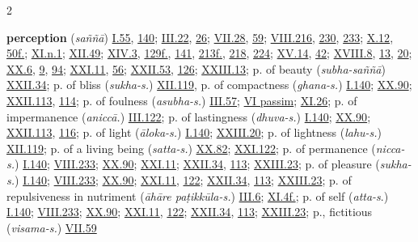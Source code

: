 \begin{multicols}{2}
\begin{vismHanging}
\par\textbf{perception} (\emph{saññā}) \hyperlink{I.55}{I.55}{}, \hyperlink{I.140}{140}{}; \hyperlink{III.22}{III.22}{}, \hyperlink{III.26}{26}{}; \hyperlink{VII.28}{VII.28}{}, \hyperlink{VII.59}{59}{}; \hyperlink{VIII.216}{VIII.216}{}, \hyperlink{VIII.230}{230}{}, \hyperlink{VIII.233}{233}{}; \hyperlink{X.12}{X.12}{}, \hyperlink{X.50}{50f.}{}; \hyperlink{XI.n1}{XI.n.1}{}; \hyperlink{XII.49}{XII.49}{}; \hyperlink{XIV.3}{XIV.3}{}, \hyperlink{XIV.129}{129f.}{}, \hyperlink{XIV.141}{141}{}, \hyperlink{XIV.213}{213f.}{}, \hyperlink{XIV.218}{218}{}, \hyperlink{XIV.224}{224}{}; \hyperlink{XV.14}{XV.14}{}, \hyperlink{XV.42}{42}{}; \hyperlink{XVIII.8}{XVIII.8}{}, \hyperlink{XVIII.13}{13}{}, \hyperlink{XVIII.20}{20}{}; \hyperlink{XX.6}{XX.6}{}, \hyperlink{XX.9}{9}{}, \hyperlink{XX.94}{94}{}; \hyperlink{XXI.11}{XXI.11}{}, \hyperlink{XXI.56}{56}{}; \hyperlink{XXII.53}{XXII.53}{}, \hyperlink{XXII.126}{126}{}; \hyperlink{XXIII.13}{XXIII.13}{}; p. of beauty (\emph{subha-saññā}) \hyperlink{XXII.34}{XXII.34}{}; p. of bliss (\emph{sukha-s.}) \hyperlink{XII.119}{XII.119}{}, p. of compactness (\emph{ghana-s.}) \hyperlink{I.140}{I.140}{}; \hyperlink{XX.90}{XX.90}{}; \hyperlink{XXII.113}{XXII.113}{}, \hyperlink{XXII.114}{114}{}; p. of foulness (\emph{asubha-s.}) \hyperlink{III.57}{III.57}{}; \hyperlink{VI}{VI passim}{}; \hyperlink{XI.26}{XI.26}{}; p. of impermanence (\emph{aniccā.}) \hyperlink{III.122}{III.122}{}; p. of lastingness (\emph{dhuva-s.}) \hyperlink{I.140}{I.140}{}; \hyperlink{XX.90}{XX.90}{}; \hyperlink{XXII.113}{XXII.113}{}, \hyperlink{XXII.116}{116}{}; p. of light (\emph{āloka-s.}) \hyperlink{I.140}{I.140}{}; \hyperlink{XXIII.20}{XXIII.20}{}; p. of lightness (\emph{lahu-s.}) \hyperlink{XII.119}{XII.119}{}; p. of a living being (\emph{satta-s.}) \hyperlink{XX.82}{XX.82}{}; \hyperlink{XXI.122}{XXI.122}{}; p. of permanence (\emph{nicca-s.}) \hyperlink{I.140}{I.140}{}; \hyperlink{VIII.233}{VIII.233}{}; \hyperlink{XX.90}{XX.90}{}; \hyperlink{XXI.11}{XXI.11}{}; \hyperlink{XXII.34}{XXII.34}{}, \hyperlink{XXII.113}{113}{}; \hyperlink{XXIII.23}{XXIII.23}{}; p. of pleasure (\emph{sukha-s.}) \hyperlink{I.140}{I.140}{}; \hyperlink{VIII.233}{VIII.233}{}; \hyperlink{XX.90}{XX.90}{}; \hyperlink{XXI.11}{XXI.11}{}, \hyperlink{XXI.122}{122}{}; \hyperlink{XXII.34}{XXII.34}{}, \hyperlink{XXII.113}{113}{}; \hyperlink{XXIII.23}{XXIII.23}{}; p. of repulsiveness in nutriment (\emph{āhāre paṭikkūla-s.}) \hyperlink{III.6}{III.6}{}; \hyperlink{XI.4}{XI.4f.}{}; p. of self (\emph{atta-s}.) \hyperlink{I.140}{I.140}{}; \hyperlink{VIII.233}{VIII.233}{}; \hyperlink{XX.90}{XX.90}{}; \hyperlink{XXI.11}{XXI.11}{}, \hyperlink{XXI.122}{122}{}; \hyperlink{XXII.34}{XXII.34}{}, \hyperlink{XXII.113}{113}{}; \hyperlink{XXIII.23}{XXIII.23}{}; p., fictitious (\emph{visama-s.}) \hyperlink{VII.59}{VII.59}{}

\end{vismHanging}
\end{multicols}
